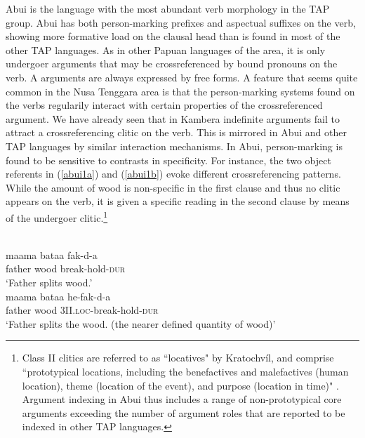 Abui is the language with the most abundant verb morphology in the TAP group. Abui has both person-marking prefixes and aspectual suffixes on the verb, showing more formative load on the clausal head than is found in most of the other TAP languages. As in other Papuan languages of the area, it is only undergoer arguments that may be crossreferenced by bound pronouns on the verb. A arguments are always expressed by free forms. A feature that seems quite common in the Nusa Tenggara area is that the person-marking systems found on the verbs regularily interact with certain properties of the crossreferenced argument. We have already seen that in Kambera indefinite arguments fail to attract a crossreferencing clitic on the verb. This is mirrored in Abui and other TAP languages by similar interaction mechanisms. In Abui, person-marking is found to be sensitive to contrasts in specificity. For instance, the two object referents in (\ref{abui1a}) and (\ref{abui1b}) evoke different crossreferencing patterns. While the amount of wood is non-specific in the first clause and thus no clitic appears on the verb, it is given a specific reading in the second clause by means of the undergoer clitic.\footnote{Class II clitics are referred to as ``locatives" by Kratochvíl, and comprise ``prototypical locations, including the
benefactives and malefactives (human location), theme (location of the event), and
purpose (location in time)" \citep[188]{kratochvil2007grammar}. Argument indexing in Abui thus includes a range of non-prototypical core arguments exceeding the number of argument roles that are reported to be indexed in other TAP languages.}

\ea
{}\\
\ea \label{abui1a}
\gll maama bataa fak-d-a \\
father wood break-hold-\textsc{dur} \\
\glft `Father splits wood.’ \\ 
\ex \label{abui1b}
\gll maama bataa he-fak-d-a \\ 
father wood \textsc{3}II.\textsc{loc}-break-hold-\textsc{dur} \\
\glft `Father splits the wood. (the nearer defined quantity of wood)’\\ 
\z
\z

